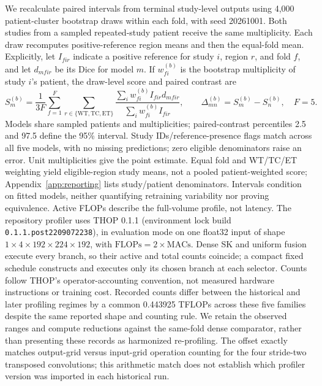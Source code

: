 \documentclass[mathematics,article,submit,pdftex,moreauthors]{Definitions/mdpi}
\begin{document}
We recalculate paired intervals from terminal study-level outputs using
4,000 patient-cluster bootstrap draws within each fold, with seed 20261001.
Both studies from a sampled repeated-study patient receive the same
multiplicity. Each draw recomputes positive-reference region means and then
the equal-fold mean. Explicitly, let $I_{fir}$ indicate a positive reference
for study $i$, region $r$, and fold $f$, and let $d_{mfir}$ be its Dice for
model $m$. If $w_{fi}^{(b)}$ is the bootstrap multiplicity of study $i$'s
patient, the draw-level score and paired contrast are
\begin{equation}\label{eq:bootstrap}
 S_m^{(b)}=\frac{1}{3F}\sum_{f=1}^{F}\sum_{r\in\{\mathrm{WT,TC,ET}\}}
 \frac{\sum_i w_{fi}^{(b)} I_{fir}d_{mfir}}
      {\sum_i w_{fi}^{(b)} I_{fir}},\qquad
 \Delta_{mn}^{(b)}=S_m^{(b)}-S_n^{(b)},\quad F=5.
\end{equation}
Models share sampled patients and multiplicities; paired-contrast percentiles
2.5 and 97.5 define the 95\% interval. Study IDs/reference-presence flags
match across all five models, with no missing predictions; zero eligible
denominators raise an error. Unit multiplicities give the point estimate.
Equal fold and WT/TC/ET weighting yield eligible-region study means, not a
pooled patient-weighted score; Appendix~\ref{app:reporting} lists study/patient
denominators. Intervals condition on fitted models, neither quantifying
retraining variability nor proving equivalence. Active FLOPs describe the
full-volume profile, not latency.
The repository profiler uses THOP 0.1.1 (environment lock build
\texttt{0.1.1.post2209072238}), in evaluation mode on one float32 input of
shape $1\times4\times192\times224\times192$, with
$\mathrm{FLOPs}=2\times\mathrm{MACs}$. Dense SK and uniform fusion execute
every branch, so their active and total counts coincide; a compact fixed
schedule constructs and executes only its chosen branch at each selector.
Counts follow THOP's operator-accounting convention, not measured hardware
instructions or training cost.
Recorded counts differ between the historical and later profiling regimes
by a common 0.443925 TFLOPs across these five families despite the same
reported shape and counting rule. We retain the observed ranges and compute
reductions against the same-fold dense comparator, rather than presenting
these records as harmonized re-profiling. The offset exactly matches
output-grid versus input-grid operation counting for the four stride-two
transposed convolutions; this arithmetic match does not establish which
profiler version was imported in each historical run.
\end{document}
